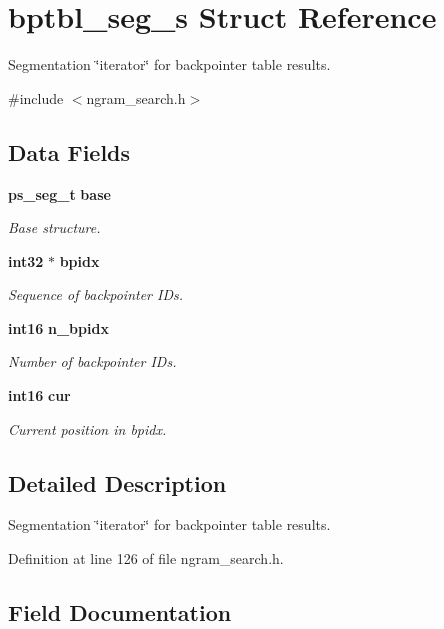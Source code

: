 \section{bptbl\-\_\-seg\-\_\-s \-Struct \-Reference}
\label{structbptbl__seg__s}


\-Segmentation \char`\"{}iterator\char`\"{} for backpointer table results.  




{\ttfamily \#include $<$ngram\-\_\-search.\-h$>$}

\subsection*{\-Data \-Fields}
\begin{DoxyCompactItemize}
\item 
{\bf ps\-\_\-seg\-\_\-t} {\bf base}
\begin{DoxyCompactList}\small\item\em \-Base structure. \end{DoxyCompactList}\item 
{\bf int32} $\ast$ {\bf bpidx}
\begin{DoxyCompactList}\small\item\em \-Sequence of backpointer \-I\-Ds. \end{DoxyCompactList}\item 
{\bf int16} {\bf n\-\_\-bpidx}
\begin{DoxyCompactList}\small\item\em \-Number of backpointer \-I\-Ds. \end{DoxyCompactList}\item 
{\bf int16} {\bf cur}
\begin{DoxyCompactList}\small\item\em \-Current position in bpidx. \end{DoxyCompactList}\end{DoxyCompactItemize}


\subsection{\-Detailed \-Description}
\-Segmentation \char`\"{}iterator\char`\"{} for backpointer table results. 

\-Definition at line 126 of file ngram\-\_\-search.\-h.



\subsection{\-Field \-Documentation}
